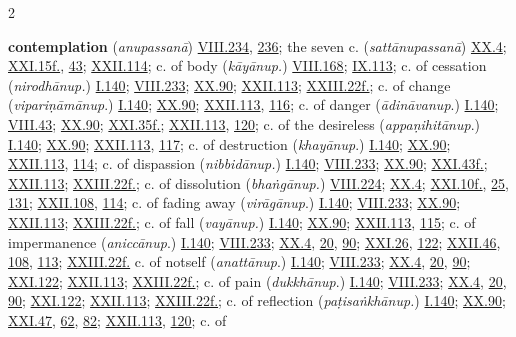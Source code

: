 \begin{multicols}{2}
\begin{vismHanging}
\par\textbf{contemplation} (\emph{anupassanā}) \hyperlink{VIII.234}{VIII.234}{}, \hyperlink{VIII.236}{236}{}; the seven c. (\emph{sattānupassanā}) \hyperlink{XX.4}{XX.4}{}; \hyperlink{XXI.15}{XXI.15f.}{}, \hyperlink{XXI.43}{43}{}; \hyperlink{XXII.114}{XXII.114}{}; c. of body (\emph{kāyānup.}) \hyperlink{VIII.168}{VIII.168}{}; \hyperlink{IX.113}{IX.113}{}; c. of cessation (\emph{nirodhānup.}) \hyperlink{I.140}{I.140}{}; \hyperlink{VIII.233}{VIII.233}{}; \hyperlink{XX.90}{XX.90}{}; \hyperlink{XXII.113}{XXII.113}{}; \hyperlink{XXIII.22}{XXIII.22f.}{}; c. of change (\emph{vipariṇāmānup}.) \hyperlink{I.140}{I.140}{}; \hyperlink{XX.90}{XX.90}{}; \hyperlink{XXII.113}{XXII.113}{}, \hyperlink{XXII.116}{116}{}; c. of danger (\emph{ādināvanup}.) \hyperlink{I.140}{I.140}{}; \hyperlink{VIII.43}{VIII.43}{}; \hyperlink{XX.90}{XX.90}{}; \hyperlink{XXI.35}{XXI.35f.}{}; \hyperlink{XXII.113}{XXII.113}{}, \hyperlink{XXII.120}{120}{}; c. of the desireless (\emph{appaṇihitānup}.) \hyperlink{I.140}{I.140}{}; \hyperlink{XX.90}{XX.90}{}; \hyperlink{XXII.113}{XXII.113}{}, \hyperlink{XXII.117}{117}{}; c. of destruction (\emph{khayānup}.) \hyperlink{I.140}{I.140}{}; \hyperlink{XX.90}{XX.90}{}; \hyperlink{XXII.113}{XXII.113}{}, \hyperlink{XXII.114}{114}{}; c. of dispassion (\emph{nibbidānup.}) \hyperlink{I.140}{I.140}{}; \hyperlink{VIII.233}{VIII.233}{}; \hyperlink{XX.90}{XX.90}{}; \hyperlink{XXI.43}{XXI.43f.}{}; \hyperlink{XXII.113}{XXII.113}{}; \hyperlink{XXIII.22}{XXIII.22f.}{}; c. of dissolution (\emph{bhaṅgānup.}) \hyperlink{VIII.224}{VIII.224}{}; \hyperlink{XX.4}{XX.4}{}; \hyperlink{XXI.10}{XXI.10f.}{}, \hyperlink{XXI.25}{25}{}, \hyperlink{XXI.131}{131}{}; \hyperlink{XXII.108}{XXII.108}{}, \hyperlink{XXII.114}{114}{}; c. of fading away (\emph{virāgānup}.) \hyperlink{I.140}{I.140}{}; \hyperlink{VIII.233}{VIII.233}{}; \hyperlink{XX.90}{XX.90}{}; \hyperlink{XXII.113}{XXII.113}{}; \hyperlink{XXIII.22}{XXIII.22f.}{}; c. of fall (\emph{vayānup.}) \hyperlink{I.140}{I.140}{}; \hyperlink{XX.90}{XX.90}{}; \hyperlink{XXII.113}{XXII.113}{}, \hyperlink{XXII.115}{115}{}; c. of impermanence (\emph{aniccānup}.) \hyperlink{I.140}{I.140}{}; \hyperlink{VIII.233}{VIII.233}{}; \hyperlink{XX.4}{XX.4}{}, \hyperlink{XX.20}{20}{}, \hyperlink{XX.90}{90}{}; \hyperlink{XXI.26}{XXI.26}{}, \hyperlink{XXI.122}{122}{}; \hyperlink{XXII.46}{XXII.46}{}, \hyperlink{XXII.108}{108}{}, \hyperlink{XXII.113}{113}{}; \hyperlink{XXIII.22}{XXIII.22f.}{} c. of notself (\emph{anattānup}.) \hyperlink{I.140}{I.140}{}; \hyperlink{VIII.233}{VIII.233}{}; \hyperlink{XX.4}{XX.4}{}, \hyperlink{XX.20}{20}{}, \hyperlink{XX.90}{90}{}; \hyperlink{XXI.122}{XXI.122}{}; \hyperlink{XXII.113}{XXII.113}{}; \hyperlink{XXIII.22}{XXIII.22f.}{}; c. of pain (\emph{dukkhānup}.) \hyperlink{I.140}{I.140}{}; \hyperlink{VIII.233}{VIII.233}{}; \hyperlink{XX.4}{XX.4}{}, \hyperlink{XX.20}{20}{}, \hyperlink{XX.90}{90}{}; \hyperlink{XXI.122}{XXI.122}{}; \hyperlink{XXII.113}{XXII.113}{}; \hyperlink{XXIII.22}{XXIII.22f.}{}; c. of reflection (\emph{paṭisaṅkhānup.}) \hyperlink{I.140}{I.140}{}; \hyperlink{XX.90}{XX.90}{}; \hyperlink{XXI.47}{XXI.47}{}, \hyperlink{XXI.62}{62}{}, \hyperlink{XXI.82}{82}{}; \hyperlink{XXII.113}{XXII.113}{}, \hyperlink{XXII.120}{120}{}; c. of 
\end{vismHanging}
\end{multicols}
